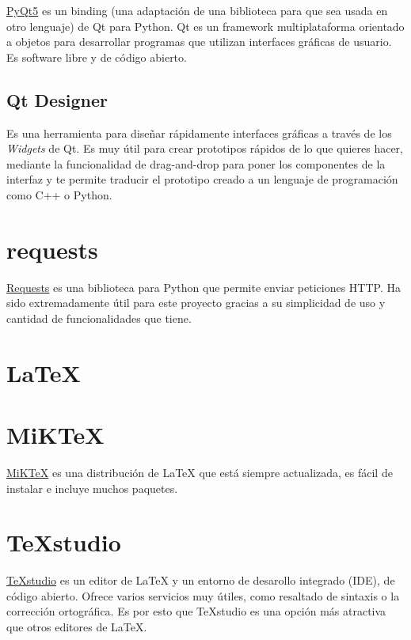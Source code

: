 \href{https://doc.qt.io/qtforpython/}{PyQt5} es un binding (una adaptación de una biblioteca para que sea usada en otro lenguaje) de Qt para Python. Qt es un framework multiplataforma orientado a objetos para desarrollar programas que utilizan interfaces gráficas de usuario. Es software libre y de código abierto.

\subsection{Qt Designer}
Es una herramienta para diseñar rápidamente interfaces gráficas a través de los \textit{Widgets} de Qt. Es muy útil para crear prototipos rápidos de lo que quieres hacer, mediante la funcionalidad de drag-and-drop para poner los componentes de la interfaz y te permite traducir el prototipo creado a un lenguaje de programación como C++ o Python.

\section{requests}

\href{https://requests.readthedocs.io/es/latest/}{Requests} es una biblioteca para Python que permite enviar peticiones HTTP. Ha sido extremadamente útil para este proyecto gracias a su simplicidad de uso y cantidad de funcionalidades que tiene.

\section{LaTeX}

\section{MiKTeX}

\href{https://miktex.org/}{MiKTeX} es una distribución de LaTeX que está siempre actualizada, es fácil de instalar e incluye muchos paquetes.

\section{TeXstudio}

\href{https://www.texstudio.org/}{TeXstudio} es un editor de LaTeX y un entorno de desarollo integrado (IDE), de código abierto. Ofrece varios servicios muy útiles, como resaltado de sintaxis	o la corrección ortográfica. Es por esto que TeXstudio es una opción más atractiva que otros editores de LaTeX.

